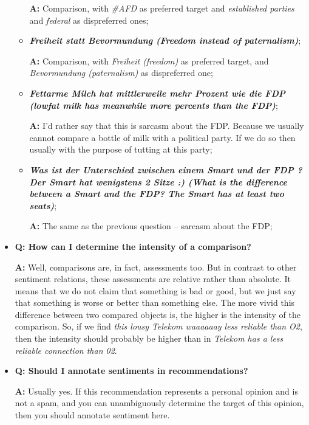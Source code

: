 \documentclass[11pt,a4paper]{article}
\begin{document}
\begin{itemize}
\begin{itemize}
    \textbf{A:} Comparison, with \textit{\#AFD} as preferred target
    and \textit{established parties} and \textit{federal} as
    dispreferred ones;

  \item\textbf{\textit{Freiheit statt Bevormundung (Freedom instead of
      paternalism)}};

    \textbf{A:} Comparison, with \textit{Freiheit (freedom)} as
    preferred target, and \textit{Bevormundung (paternalism)} as
    dispreferred one;

  \item\textbf{\textit{Fettarme Milch hat mittlerweile mehr Prozent
      wie die FDP (lowfat milk has meanwhile more percents than the
      FDP)}};

    \textbf{A:} I'd rather say that this is sarcasm about the FDP.
    Because we usually cannot compare a bottle of milk with a
    political party.  If we do so then usually with the purpose of
    tutting at this party;

  \item\textbf{\textit{Was ist der Unterschied zwischen einem Smart
      und der FDP ? Der Smart hat wenigstens 2 Sitze :) (What is the
      difference between a Smart and the FDP? The Smart has at least
      two seats)}};

    \textbf{A:} The same as the previous question -- sarcasm about the
    FDP;
  \end{itemize}

\item\textbf{Q: How can I determine the intensity of a comparison?}

  \textbf{A:} Well, comparisons are, in fact, assessments too.  But in
  contrast to other sentiment relations, these assessments are
  relative rather than absolute.  It means that we do not claim that
  something is bad or good, but we just say that something is worse or
  better than something else.  The more vivid this difference between
  two compared objects is, the higher is the intensity of the
  comparison.  So, if we find \textit{this lousy Telekom waaaaaay less
    reliable than O2}, then the intensity should probably be higher
  than in \textit{Telekom has a less reliable connection than 02}.

\item\textbf{Q: Should I annotate sentiments in recommendations?}

  \textbf{A:} Usually yes.  If this recommendation represents a
  personal opinion and is not a spam, and you can unambiguously
  determine the target of this opinion, then you should annotate
  sentiment here.


\end{itemize}
\end{document}
